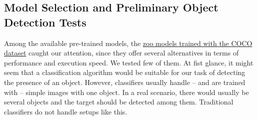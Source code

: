 \documentclass[10pt,conference,compsocconf]{IEEEtran}
\begin{document}
\subsection{Model Selection and Preliminary Object Detection Tests}
Among the available pre-trained models, the \href{https://github.com/tensorflow/models/blob/master/research/object\_detection/g3doc/detection_model_zoo.md}{zoo models trained with the COCO dataset} caught our attention, since they offer several alternatives in terms of performance and execution speed. We tested few of them.
At fist glance, it might seem that a classification algorithm would be suitable for our task of detecting the presence of an object.
However, classifiers usually handle -- and are trained with -- simple images with one object. In a real scenario, there would usually be several objects and the target should be detected among them. Traditional classifiers do not handle setups like this.
\end{document}
